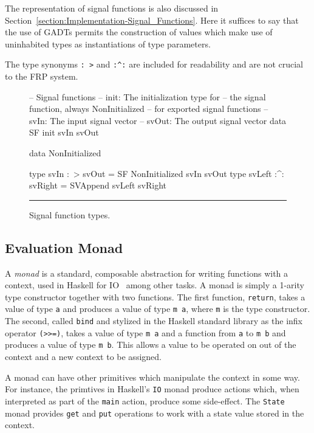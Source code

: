 The representation of signal functions is also discussed in
Section~\ref{section:Implementation-Signal_Functions}. Here it suffices to say
that the use of GADTs permits the construction of values which make use of
uninhabited types as instantiations of type parameters.

The type synonyms {\tt :~>} and {\tt :\textasciicircum:} are included for readability and are
not crucial to the FRP system.

\begin{figure}
\begin{code}
-- Signal functions
-- init: The initialization type for 
-- the signal function, always NonInitialized
-- for exported signal functions
-- svIn: The input signal vector
-- svOut: The output signal vector
data SF init svIn svOut

data NonInitialized

type svIn :~> svOut = SF NonInitialized svIn svOut
type svLeft :^: svRight = SVAppend svLeft svRight
\end{code}
\hrule
\caption{Signal function types.}
\label{figure:signal_function_types}
\end{figure}

\subsection{Evaluation Monad}
\label{section:System_Design_and_Interface-Types-Evaluation_Monad}

A {\em monad} is a standard, composable abstraction for writing functions with
a context, used in Haskell for IO~\cite{PeytonJones1993,PeytonJones2001} among
other tasks. A monad is simply a 1-arity type constructor together with two
functions. The first function, {\tt return}, takes a value of type {\tt a} and
produces a value of type {\tt m a}, where {\tt m} is the type constructor. The
second, called {\tt bind} and stylized in the Haskell standard library as the
infix operator {\tt (>>=)}, takes a value of type {\tt m a} and a function
from {\tt a} to {\tt m b} and produces a value of type {\tt m b}. This allows
a value to be operated on out of the context and a new context to be assigned.

A monad can have other primitives which manipulate the context in some way. For 
instance, the primtives in Haskell's {\tt IO} monad produce actions which, when
interpreted as part of the {\tt main} action, produce some side-effect. The
{\tt State} monad provides {\tt get} and {\tt put} operations to work with a 
state value stored in the context.

